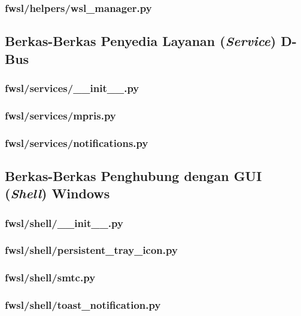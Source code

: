 \subsubsection{fwsl/helpers/wsl\_manager.py}



\subsection{Berkas-Berkas Penyedia Layanan (\textit{Service}) D-Bus}

\subsubsection{fwsl/services/\_\_init\_\_.py}


\subsubsection{fwsl/services/mpris.py}


\subsubsection{fwsl/services/notifications.py}



\subsection{Berkas-Berkas Penghubung dengan GUI (\textit{Shell}) Windows}

\subsubsection{fwsl/shell/\_\_init\_\_.py}


\subsubsection{fwsl/shell/persistent\_tray\_icon.py}


\subsubsection{fwsl/shell/smtc.py}


\subsubsection{fwsl/shell/toast\_notification.py}

